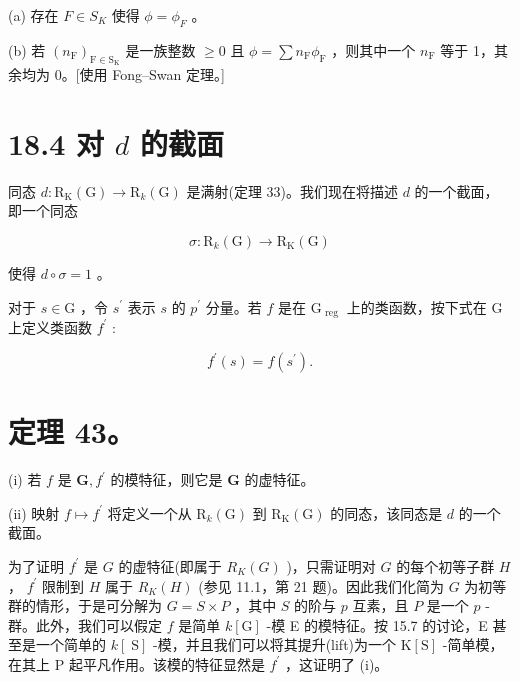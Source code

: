 \documentclass[10pt]{article}
\begin{document}
(a) 存在 \(F \in  {S}_{K}\) 使得 \(\phi  = {\phi }_{F}\) 。

(b) 若 \({\left( {n}_{\mathrm{F}}\right) }_{\mathrm{F} \in  {\mathrm{S}}_{\mathrm{K}}}\) 是一族整数 \(\geq  0\) 且 \(\phi  = \sum {n}_{\mathrm{F}}{\phi }_{\mathrm{F}}\) ，则其中一个 \({n}_{\mathrm{F}}\) 等于 1，其余均为 0。[使用 Fong–Swan 定理。]

\section*{18.4 对 \(d\) 的截面}

同态 \(d : {\mathrm{R}}_{\mathrm{K}}\left( \mathrm{G}\right)  \rightarrow  {\mathrm{R}}_{k}\left( \mathrm{G}\right)\) 是满射(定理 33)。我们现在将描述 \(d\) 的一个截面，即一个同态

\[
\sigma  : {\mathrm{R}}_{k}\left( \mathrm{G}\right)  \rightarrow  {\mathrm{R}}_{\mathrm{K}}\left( \mathrm{G}\right)
\]

使得 \(d \circ  \sigma  = 1\) 。

对于 \(s \in  \mathrm{G}\) ，令 \({s}^{\prime }\) 表示 \(s\) 的 \({p}^{\prime }\) 分量。若 \(f\) 是在 \({\mathrm{G}}_{\text{ reg }}\) 上的类函数，按下式在 \(\mathrm{G}\) 上定义类函数 \({f}^{\prime }\) :

\[
{f}^{\prime }\left( s\right)  = f\left( {s}^{\prime }\right) .
\]

\section*{定理 43。}

(i) 若 \(f\) 是 \(\mathbf{G},{f}^{\prime }\) 的模特征，则它是 \(\mathbf{G}\) 的虚特征。

(ii) 映射 \(f \mapsto  {f}^{\prime }\) 将定义一个从 \({\mathrm{R}}_{k}\left( \mathrm{G}\right)\) 到 \({\mathrm{R}}_{\mathrm{K}}\left( \mathrm{G}\right)\) 的同态，该同态是 \(d\) 的一个截面。

为了证明 \({f}^{\prime }\) 是 \(G\) 的虚特征(即属于 \({R}_{K}\left( G\right)\) )，只需证明对 \(G\) 的每个初等子群 \(H\) ， \({f}^{\prime }\) 限制到 \(H\) 属于 \({R}_{K}\left( H\right)\) (参见 11.1，第 21 题)。因此我们化简为 \(G\) 为初等群的情形，于是可分解为 \(G = S \times  P\) ，其中 \(S\) 的阶与 \(p\) 互素，且 \(P\) 是一个 \(p\) -群。此外，我们可以假定 \(f\) 是简单 \(k\left\lbrack  \mathrm{G}\right\rbrack\) -模 E 的模特征。按 15.7 的讨论，E 甚至是一个简单的 \(k\left\lbrack  \mathrm{\;S}\right\rbrack\) -模，并且我们可以将其提升(lift)为一个 \(\mathrm{K}\left\lbrack  \mathrm{S}\right\rbrack\) -简单模，在其上 \(\mathrm{P}\) 起平凡作用。该模的特征显然是 \({f}^{\prime }\) ，这证明了 (i)。
\end{document}
